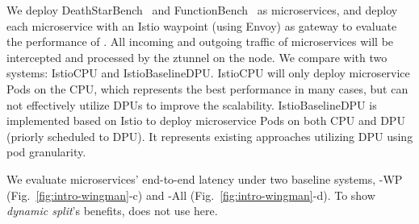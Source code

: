 We deploy DeathStarBench~\cite{10.1145/3297858.3304013} and FunctionBench~\cite{kim2019practical} as microservices, and deploy each microservice with an Istio waypoint (using Envoy) as gateway to evaluate the performance of \mesh.
All incoming and outgoing traffic of microservices will be intercepted and processed by the ztunnel on the node.
We compare \mesh with two systems: IstioCPU and IstioBaselineDPU.
IstioCPU will only deploy microservice Pods on the CPU, which represents the best performance in many cases, but can not effectively utilize DPUs to improve the scalability.
IstioBaselineDPU is implemented based on Istio to deploy microservice Pods on both CPU and DPU (priorly scheduled to DPU).
It represents existing approaches utilizing DPU using pod granularity.

We evaluate microservices' end-to-end latency under two baseline systems, \sys-WP (Fig.~\ref{fig:intro-wingman}-c) and \sys-All (Fig.~\ref{fig:intro-wingman}-d). 
To show \emph{dynamic split}'s benefits, \mesh does not use \gsocket here.

